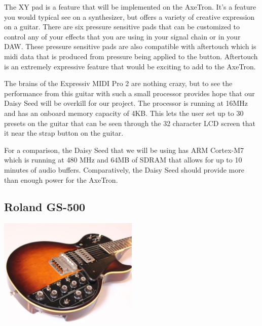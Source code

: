 \documentclass[]{MSword}
\begin{document}
\par{The XY pad is a feature that will be implemented on the AxeTron.  It’s a feature you would typical see on a synthesizer, but offers a variety of creative expression on a guitar. There are six pressure sensitive pads that can be customized to control any of your effects that you are using in your signal chain or in your DAW. These pressure sensitive pads are also compatible with aftertouch which is midi data that is produced from pressure being applied to the button. Aftertouch is an extremely expressive feature that would be exciting to add to the AxeTron.}

\par{The brains of the Expressiv MIDI Pro 2 are nothing crazy, but to see the performance from this guitar with such a small processor provides hope that our Daisy Seed will be overkill for our project. The processor is running at 16MHz and has an onboard memory capacity of 4KB. This lets the user set up to 30 presets on the guitar that can be seen through the 32 character LCD screen that it near the strap button on the guitar.}

\par{For a comparison, the Daisy Seed\cite{daisyseed} that we will be using has ARM Cortex-M7 which is running at 480 MHz and 64MB of SDRAM that allows for up to 10 minutes of audio buffers. Comparatively, the Daisy Seed should provide more than enough power for the AxeTron.}

\subsection*{Roland GS-500}

\begin{center}
  \includegraphics[width=0.5\textwidth]{img/rolandgs500.jpg}
\end{center}
\end{document}

